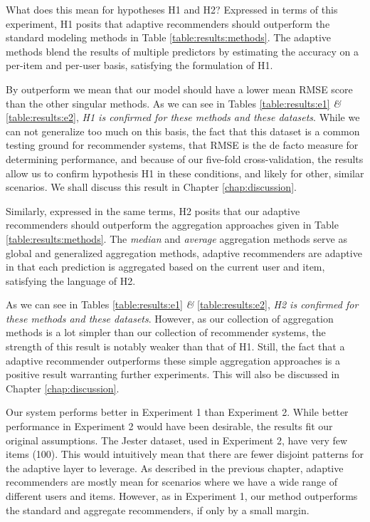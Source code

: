 What does this mean for hypotheses H1 and H2?
Expressed in terms of this experiment,
H1 posits that adaptive recommenders should outperform the standard modeling methods
in Table \ref{table:results:methods}.
The adaptive methods blend the results of multiple predictors by estimating the accuracy
on a per-item and per-user basis, satisfying the formulation of H1.

By outperform we mean that our model should have a lower
mean RMSE score than the other singular methods. As we can see in Tables \ref{table:results:e1} \emph{\&} \ref{table:results:e2},
\emph{H1 is confirmed for these methods and these datasets}.
While we can not generalize too much on this basis, 
the fact that this dataset is a common testing ground for recommender systems,
that RMSE is the de facto measure for determining performance,
and because of our five-fold cross-validation, the results allow us 
to confirm hypothesis H1 in these conditions, and likely for other, similar scenarios.
We shall discuss this result in Chapter \ref{chap:discussion}.

Similarly, expressed in the same terms, H2 posits that 
our adaptive recommenders should outperform the aggregation approaches
given in Table \ref{table:results:methods}.
The \emph{median} and \emph{average} aggregation methods
serve as global and generalized aggregation methods,
adaptive recommenders are adaptive in that each prediction is 
aggregated based on the current user and item,
satisfying the language of H2.

As we can see in Tables \ref{table:results:e1} \emph{\&} \ref{table:results:e2},
\emph{H2 is confirmed for these methods and these datasets}.
However, as our collection of aggregation methods is a lot simpler
than our collection of recommender systems, the strength of this result
is notably weaker than that of H1.
Still, the fact that a adaptive recommender outperforms these simple aggregation
approaches is a positive result warranting further experiments.
This will also be discussed in Chapter \ref{chap:discussion}.

Our system performs better in Experiment 1 than Experiment 2.
While better performance in Experiment 2 would have been desirable,
the results fit our original assumptions.
The Jester dataset, used in Experiment 2, have very few items (100).
This would intuitively mean that there are fewer disjoint
patterns for the adaptive layer to leverage.
As described in the previous chapter, adaptive recommenders
are mostly mean for scenarios where we have a wide range of
different users and items.
However, as in Experiment 1, our method outperforms the standard and aggregate recommenders,
if only by a small margin.

